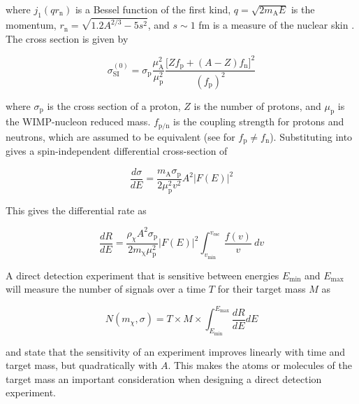 \noindent where $j_1(q r_{\mathrm{n}})$ is a Bessel function of the first kind, $q = \sqrt{2m_{\mathrm{A}}E}$ is the momentum,
$r_{\mathrm{n}} = \sqrt{1.2A^{2/3} - 5s^{2}}$, and $s \sim 1$ fm is a measure of the nuclear skin .  The
cross section is given by

\begin{equation} \label{eq:sigma_si}
\sigma_{\mathrm{SI}}^{(0)} = \sigma_{\mathrm{p}} \frac{\mu_{\mathrm{A}}^{2}}{\mu_{\mathrm{p}}^{2}} \frac{\big[ Z f_{\mathrm{p}} +
(A - Z) f_{\mathrm{n}} \big]^{2}}{(f_{\mathrm{p}})^{2}}
\end{equation}

\noindent where $\sigma_{\mathrm{p}}$ is the cross section of a proton, $Z$ is the number of protons, and $\mu_{\mathrm{p}}$ is
the WIMP-nucleon reduced mass. $f_{\mathrm{p/n}}$ is the coupling strength for protons and neutrons, which are assumed to be
equivalent (see  for $f_{\mathrm{p}} \neq f_{\mathrm{n}}$).  Substituting  into
 gives a spin-independent differential cross-section of

\begin{equation}
\frac{d \sigma}{dE} = \frac{m_{\mathrm{A}} \sigma_{\mathrm{p}}}{2 \mu_{\mathrm{p}}^{2} v^{2}}
 A^{2} \big| F(E) \big |^{2}
\end{equation}

\noindent This gives the differential rate as 

\begin{equation}
\frac{dR}{dE} = \frac{\rho_{\chi} A^{2} \sigma_{\mathrm{p}}}{2 m_{\mathrm{\chi}} \mu_{\mathrm{p}}^{2}}
  \big| F(E) \big |^{2} \int_{v_{\mathrm{min}}}^{v_{\mathrm{esc}}}
\frac{f(v)}{v}\ dv
\label{eq:dr_de_final}
\end{equation}

\noindent A direct detection experiment that is sensitive between energies $E_{\mathrm{min}}$ and $E_{\mathrm{max}}$ will measure
the number of signals over a time $T$ for their target mass $M$ as

\begin{equation} \label{eq:counts}
N ( m_{\chi}, \sigma) = T \times M \times \int_{E_{\mathrm{min}}}^{E_{\mathrm{max}}} \frac{dR}{dE} dE
\end{equation}

\noindent {} and  state that the sensitivity of an experiment improves linearly with time and
target mass, but quadratically with $A$.  This makes the atoms or molecules of the target mass an important consideration when
designing a direct detection experiment.


